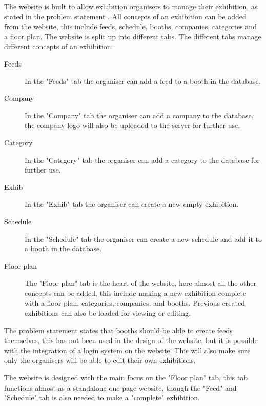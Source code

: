\label{sec:websiteimplementation}
The website is built to allow exhibition organisers to manage their exhibition, as stated in the problem statement . All concepts of an exhibition can be added from the website, this include feeds, schedule, booths, companies, categories and a floor plan. The website is split up into different tabs. The different tabs manage different concepts of an exhibition:

\begin{description}
	\item[Feeds] In the "Feeds" tab the organiser can add a feed to a booth in the database.
	\item[Company] In the "Company" tab the organiser can add a company to the database, the company logo will also be uploaded to the server for further use.
	\item[Category] In the "Category" tab the organiser can add a category to the database for further use.
	\item[Exhib] In the "Exhib" tab the organiser can create a new empty exhibition.
	\item[Schedule] In the "Schedule" tab the organiser can create a new schedule and add it to a booth in the database.
	\item[Floor plan] The "Floor plan" tab is the heart of the website, here almost all the other concepts can be added, this include making a new exhibition complete with a floor plan, categories, companies, and booths. Previous created exhibitions can also be loaded for viewing or editing.
\end{description}

The problem statement  states that booths should be able to create feeds themselves, this has not been used in the design of the website, but it is possible with the integration of a login system on the website. This will also make sure only the organisers will be able to edit their own exhibitions.

The website is designed with the main focus on the "Floor plan" tab, this tab functions almost as a standalone one-page website, though the "Feed" and "Schedule" tab is also needed to make a "complete" exhibition.

